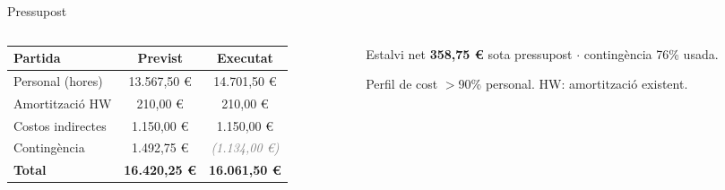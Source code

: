 \begin{frame}{Pressupost}
  \vspace{0.3em}
  \begin{columns}[T]
    \begin{column}{0.55\textwidth}
      \renewcommand{\arraystretch}{1.3}
      \begin{tabular}{lcc}
        \toprule
        \textbf{Partida} & \textbf{Previst} & \textbf{Executat} \\
        \midrule
        Personal (hores) & 13.567,50 \euro & 14.701,50 \euro \\
        Amortització HW & 210,00 \euro & 210,00 \euro \\
        Costos indirectes & 1.150,00 \euro & 1.150,00 \euro \\
        Contingència & 1.492,75 \euro & \textcolor{gray}{\textit{(1.134,00 \euro)}} \\
        \midrule
        \textbf{Total} & \textbf{16.420,25 \euro} & \textbf{16.061,50 \euro} \\
        \bottomrule
      \end{tabular}
    \end{column}

    \begin{column}{0.30\textwidth}
      \begin{exampleblock}{\centering Estalvi net}
        \centering \textbf{358,75 \euro} sota pressupost $\cdot$ contingència 76\% usada.
      \end{exampleblock}

      \vspace{0.5em}
      \begin{block}{Perfil de cost}
        \small $>$90\% personal. HW: amortització existent.
      \end{block}
    \end{column}
  \end{columns}
\end{frame}

